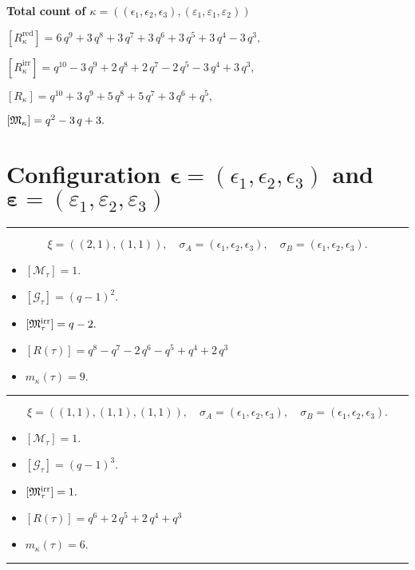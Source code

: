 \documentclass[10pt,a4paper]{amsart}
\begin{document}
\noindent\textbf{Total count of $\kappa = ((\epsilon_1,\epsilon_2,\epsilon_3), (\varepsilon_1,\varepsilon_1,\varepsilon_2))$}\medskip

${[R_{\kappa}^{\textrm{red}}]} = 6 \, q^{9} + 3 \, q^{8} + 3 \, q^{7} + 3 \, q^{6} + 3 \, q^{5} + 3 \, q^{4} - 3 \, q^{3} ,$

${[R_{\kappa}^{\textrm{irr}}]} = q^{10} - 3 \, q^{9} + 2 \, q^{8} + 2 \, q^{7} - 2 \, q^{5} - 3 \, q^{4} + 3 \, q^{3} ,$

${[R_{\kappa}]} = q^{10} + 3 \, q^{9} + 5 \, q^{8} + 5 \, q^{7} + 3 \, q^{6} + q^{5} ,$

${[{\frak M}_{\kappa}]} = q^{2} - 3 \, q + 3 .$

\newpage{}

\section{Configuration $\bm{\epsilon} = (\epsilon_1,\epsilon_2,\epsilon_3)$ and $\bm{\varepsilon} =(\varepsilon_1,\varepsilon_2,\varepsilon_3)$}
\noindent\rule{8cm}{0.4pt}

$$\xi = ({(2, 1), (1, 1)}),\quad \sigma_A = ({{\epsilon_1, \epsilon_2}, {\epsilon_3}}),\quad \sigma_B = ({{\epsilon_1, \epsilon_2}, {\epsilon_3}}).$$

\begin{itemize}
 \item $[\mathcal{M}_{\tau}] = 1 .$

 \item $[\mathcal{G}_{\tau}] = {\left(q - 1\right)}^{2} .$

 \item $[{\frak M}_{\tau}^{\textrm{irr}}] = q - 2 .$

 \item $[R(\tau)] = q^{8} - q^{7} - 2 \, q^{6} - q^{5} + q^{4} + 2 \, q^{3} $

 \item $m_{\kappa}(\tau) = 9 .$

 \end{itemize}
\noindent\rule{8cm}{0.4pt}

$$\xi = ({(1, 1), (1, 1), (1, 1)}),\quad \sigma_A = ({{\epsilon_1}, {\epsilon_2}, {\epsilon_3}}),\quad \sigma_B = ({{\epsilon_1}, {\epsilon_2}, {\epsilon_3}}).$$

\begin{itemize}
 \item $[\mathcal{M}_{\tau}] = 1 .$

 \item $[\mathcal{G}_{\tau}] = {\left(q - 1\right)}^{3} .$

 \item $[{\frak M}_{\tau}^{\textrm{irr}}] = 1 .$

 \item $[R(\tau)] = q^{6} + 2 \, q^{5} + 2 \, q^{4} + q^{3} $

 \item $m_{\kappa}(\tau) = 6 .$

 \end{itemize}
\noindent\rule{8cm}{0.4pt}
\end{document}
